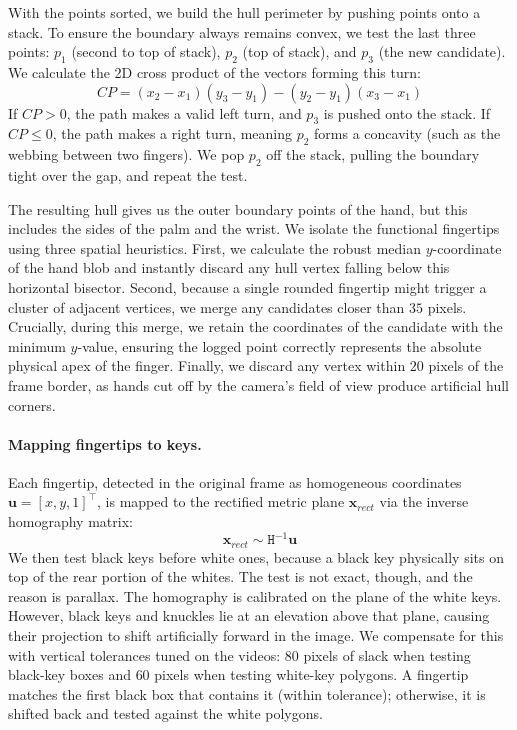 \documentclass[11pt]{article}
\begin{document}
With the points sorted, we build the hull perimeter by pushing points onto a stack. 
To ensure the boundary always remains convex, we test the last three points: $p_1$ 
(second to top of stack), $p_2$ (top of stack), and $p_3$ (the new candidate). 
We calculate the 2D cross product of the vectors forming this turn:
\begin{equation}
    CP = (x_2 - x_1)(y_3 - y_1) - (y_2 - y_1)(x_3 - x_1)
\end{equation}
If $CP > 0$, the path makes a valid left turn, and $p_3$ is pushed onto the stack. 
If $CP \le 0$, the path makes a right turn, meaning $p_2$ forms a concavity (such as 
the webbing between two fingers). We pop $p_2$ off the stack, pulling the boundary 
tight over the gap, and repeat the test.

The resulting hull gives us the outer boundary points of the hand, but this includes 
the sides of the palm and the wrist. We isolate the functional fingertips using three 
spatial heuristics. First, we calculate the robust median $y$-coordinate of the hand 
blob and instantly discard any hull vertex falling below this horizontal bisector. 
Second, because a single rounded fingertip might trigger a cluster of adjacent vertices, 
we merge any candidates closer than $35$ pixels. Crucially, during this merge, we 
retain the coordinates of the candidate with the minimum $y$-value, ensuring the logged 
point correctly represents the absolute physical apex of the finger. Finally, we discard 
any vertex within $20$ pixels of the frame border, as hands cut off by the camera's 
field of view produce artificial hull corners. 

\paragraph{Mapping fingertips to keys.}
Each fingertip, detected in the original frame as homogeneous coordinates $\mathbf{u} = [x, y, 1]^\top$, 
is mapped to the rectified metric plane $\mathbf{x}_{rect}$ via the inverse homography matrix:
\begin{equation}
    \mathbf{x}_{rect} \sim \mathtt{H}^{-1} \mathbf{u}
\end{equation}
We then test black keys before white ones, because a black key physically sits on top 
of the rear portion of the whites. The test is not exact, though, and the reason is 
parallax. The homography is calibrated on the plane of the white keys. However, black 
keys and knuckles lie at an elevation above that plane, causing their projection to 
shift artificially forward in the image. We compensate for this with vertical 
tolerances tuned on the videos: $80$ pixels of slack when testing black-key boxes 
and $60$ pixels when testing white-key polygons. A fingertip matches the first black 
box that contains it (within tolerance); otherwise, it is shifted back and tested 
against the white polygons.
\end{document}
